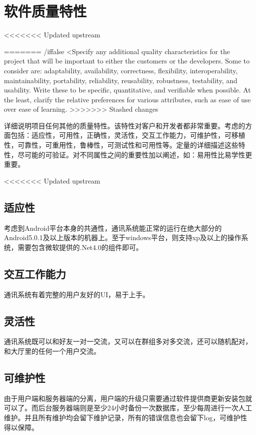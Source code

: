 \chapter{软件质量特性}
<<<<<<< Updated upstream

=======
/iffalse
<Specify any additional quality characteristics for the project that will be important to either the customers or the developers. Some to consider are: adaptability, availability, correctness, flexibility, interoperability, maintainability, portability, reliability, reusability, robustness, testability, and usability. Write these to be specific, quantitative, and verifiable when possible. At the least, clarify the relative preferences for various attributes, such as ease of use over ease of learning.
>>>>>>> Stashed changes

详细说明项目任何其他的质量特性。该特性对客户和开发者都非常重要。考虑的方面包括：适应性，可用性，正确性，灵活性，交互工作能力，可维护性，可移植性，可靠性，可重用性，鲁棒性，可测试性和可用性等。定量的详细描述这些特性，尽可能的可验证。对不同属性之间的重要性加以阐述，如：易用性比易学性更重要。


<<<<<<< Updated upstream

\section{适应性}
考虑到Android平台本身的共通性，通讯系统能正常的运行在绝大部分的Android5.0.1及以上版本的机器上。至于windows平台，则支持xp及以上的操作系统，需要包含微软提供的.Net4.0的组件即可。


\section{交互工作能力}
通讯系统有着完整的用户友好的UI，易于上手。

\section{灵活性}
通讯系统既可以和好友一对一交流，又可以在群组多对多交流，还可以随机配对，和大厅里的任何一个用户交流。

\section{可维护性}
由于用户端和服务器端的分离，用户端的升级只需要通过软件提供商更新安装包就可以了。而后台服务器端则是至少24小时备份一次数据库，至少每周进行一次人工维护。并且所有维护均会留下维护记录，所有的错误信息也会留下log，可维护性得以保障。

